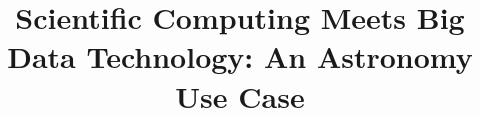 \documentclass[10pt,journal,compsoc]{IEEEtran}
\begin{document}
%
\title{Scientific Computing Meets Big Data Technology: An Astronomy Use Case}
%
%
%
%
\end{document}
